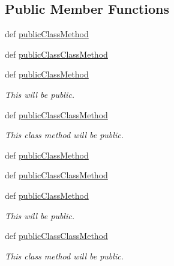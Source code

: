 \subsection*{Public Member Functions}
\begin{DoxyCompactItemize}
\item 
def \hyperlink{classdoxypypy_1_1test_1_1sample__privacy_1_1_old_style_sample_a446494775fa39342fabd41ecaeef3fa3}{public\-Class\-Method}
\item 
def \hyperlink{classdoxypypy_1_1test_1_1sample__privacy_1_1_old_style_sample_ade5b72e81a0355d2adc6a071b9328c5a}{public\-Class\-Class\-Method}
\item 
def \hyperlink{classdoxypypy_1_1test_1_1sample__privacy_1_1_old_style_sample_a446494775fa39342fabd41ecaeef3fa3}{public\-Class\-Method}
\begin{DoxyCompactList}\small\item\em This will be public. \end{DoxyCompactList}\item 
def \hyperlink{classdoxypypy_1_1test_1_1sample__privacy_1_1_old_style_sample_ade5b72e81a0355d2adc6a071b9328c5a}{public\-Class\-Class\-Method}
\begin{DoxyCompactList}\small\item\em This class method will be public. \end{DoxyCompactList}\item 
def \hyperlink{classdoxypypy_1_1test_1_1sample__privacy_1_1_old_style_sample_a446494775fa39342fabd41ecaeef3fa3}{public\-Class\-Method}
\item 
def \hyperlink{classdoxypypy_1_1test_1_1sample__privacy_1_1_old_style_sample_ade5b72e81a0355d2adc6a071b9328c5a}{public\-Class\-Class\-Method}
\item 
def \hyperlink{classdoxypypy_1_1test_1_1sample__privacy_1_1_old_style_sample_a446494775fa39342fabd41ecaeef3fa3}{public\-Class\-Method}
\begin{DoxyCompactList}\small\item\em This will be public. \end{DoxyCompactList}\item 
def \hyperlink{classdoxypypy_1_1test_1_1sample__privacy_1_1_old_style_sample_ade5b72e81a0355d2adc6a071b9328c5a}{public\-Class\-Class\-Method}
\begin{DoxyCompactList}\small\item\em This class method will be public. \end{DoxyCompactList}\item 

\end{DoxyCompactItemize}
